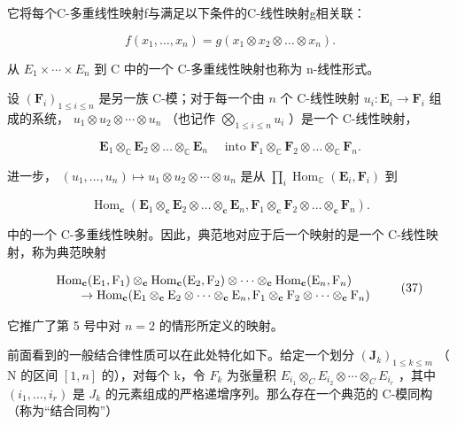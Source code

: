 它将每个C-多重线性映射f与满足以下条件的C-线性映射g相关联：

\[
f (x _ {1}, \dots , x _ {n}) = g (x _ {1} \otimes x _ {2} \otimes \dots \otimes x _ {n}).
\]

从 \(E_{1} \times \cdots \times E_{n}\) 到 C 中的一个 C-多重线性映射也称为 n-线性形式。

设 \((\mathbf{F}_i)_{1\leqslant i\leqslant n}\) 是另一族 C-模；对于每一个由 \(n\) 个 C-线性映射 \(u_i: \mathbf{E}_i \to \mathbf{F}_i\) 组成的系统， \(u_1 \otimes u_2 \otimes \cdots \otimes u_n\) （也记作 \(\bigotimes_{1\leqslant i\leqslant n} u_i\) ）是一个 C-线性映射，

\[
\mathbf {E} _ {1} \otimes_ {\mathbb {C}} \mathbf {E} _ {2} \otimes \dots \otimes_ {\mathbb {C}} \mathbf {E} _ {n} \quad \text { into } \mathbf {F} _ {1} \otimes_ {\mathbb {C}} \mathbf {F} _ {2} \otimes \dots \otimes_ {\mathbb {C}} \mathbf {F} _ {n}.
\]

进一步， \((u_{1},\ldots,u_{n})\mapsto u_{1}\otimes u_{2}\otimes\cdots\otimes u_{n}\) 是从 \(\prod_{i}\operatorname{Hom}_{\mathbb{C}}(\mathbf{E}_{i},\mathbf{F}_{i})\) 到

\[
\operatorname{Hom} _ {\mathbf {c}} (\mathbf {E} _ {1} \otimes_ {\mathbf {c}} \mathbf {E} _ {2} \otimes \dots \otimes_ {\mathbf {c}} \mathbf {E} _ {n}, \mathbf {F} _ {1} \otimes_ {\mathbf {c}} \mathbf {F} _ {2} \otimes \dots \otimes_ {\mathbf {c}} \mathbf {F} _ {n}).
\]

中的一个 C-多重线性映射。因此，典范地对应于后一个映射的是一个 C-线性映射，称为典范映射

\[
\begin{array}{r l} & \operatorname{Hom} _ {\mathbf {c}} (\mathrm{E} _ {1}, \mathrm{F} _ {1}) \otimes_ {\mathbf {c}} \operatorname{Hom} _ {\mathbf {c}} (\mathrm{E} _ {2}, \mathrm{F} _ {2}) \otimes \dots \otimes_ {\mathbf {c}} \operatorname{Hom} _ {\mathbf {c}} (\mathrm{E} _ {n}, \mathrm{F} _ {n}) \\ & \qquad \to \operatorname{Hom} _ {\mathbf {c}} (\mathrm{E} _ {1} \otimes_ {\mathbf {c}} \mathrm{E} _ {2} \otimes \dots \otimes_ {\mathbf {c}} \mathrm{E} _ {n}, \mathrm{F} _ {1} \otimes_ {\mathbf {c}} \mathrm{F} _ {2} \otimes \dots \otimes_ {\mathbf {c}} \mathrm{F} _ {n}) \end{array}\tag{37}
\]

它推广了第 5 号中对 \(n = 2\) 的情形所定义的映射。

前面看到的一般结合律性质可以在此处特化如下。给定一个划分 \((\mathbf{J}_{k})_{1\leqslant k\leqslant m}\) （ N 的区间 \([1,n]\) 的），对每个 k，令 \(F_{k}\) 为张量积 \(E_{i_{1}}\otimes_{C}E_{i_{2}}\otimes\cdots\otimes_{C}E_{i_{r}}\) ，其中 \((i_{1},\ldots,i_{r})\) 是 \(J_{k}\) 的元素组成的严格递增序列。那么存在一个典范的 C-模同构（称为“结合同构”）

